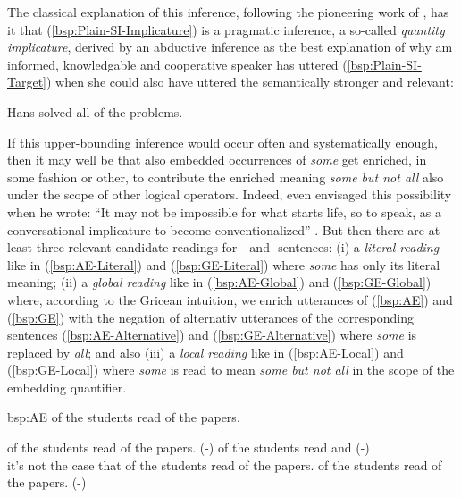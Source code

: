 \documentclass[fleqn,reqno,10pt,draft]{article}
\newcommand{\lit}{\acro{lit}}
\newcommand{\glb}{\acro{glb}}
\newcommand{\loc}{\acro{loc}}
\newcommand{\as}{\acro{as}}
\renewcommand{\es}{\acro{es}}
\newcommand{\mymark}[1]{{\color{mycol}{#1}}}
\begin{document}
\noindent The classical explanation of this inference, following the
pioneering work of \citet{Grice1975:Logic-and-Conve}, has it that
(\ref{bsp:Plain-SI-Implicature}) is a pragmatic inference, a so-called
\emph{quantity implicature}, derived by an abductive inference as the
best explanation of why am informed, knowledgable and cooperative
speaker has uttered (\ref{bsp:Plain-SI-Target}) when she could also
have uttered the semantically stronger and relevant:

\begin{exe}
    \begin{xlist}
       \label{bsp:Plain-SI-Alternative} Hans solved all of the problems.
    \end{xlist}
\end{exe}

\noindent If this upper-bounding inference would occur often and
systematically enough, then it may well be that also embedded
occurrences of \emph{some} get enriched, in some fashion or other, to
contribute the enriched meaning \emph{some but not all} also under the
scope of other logical operators. Indeed, even
\citeauthor{Grice1975:Logic-and-Conve} envisaged this possibility when
he wrote: ``It may not be impossible for what starts life, so to
speak, as a conversational implicature to become conventionalized''
\citep[p.58]{Grice1975:Logic-and-Conve}. But then there are at least
three relevant candidate readings for \as- and \es-sentences: (i) a
\emph{literal reading} like in (\ref{bsp:AE-Literal}) and
(\ref{bsp:GE-Literal}) where \emph{some} has only its literal meaning;
(ii) a \emph{global reading} like in (\ref{bsp:AE-Global}) and
(\ref{bsp:GE-Global}) where, according to the Gricean intuition, we
enrich utterances of (\ref{bsp:AE}) and (\ref{bsp:GE}) with the
negation of alternativ utterances of the corresponding sentences
(\ref{bsp:AE-Alternative}) and (\ref{bsp:GE-Alternative}) where
\emph{some} is replaced by \emph{all}; and also (iii) a \emph{local
  reading} like in (\ref{bsp:AE-Local}) and (\ref{bsp:GE-Local}) where
\emph{some} is read to mean \emph{some but not all} in the scope of
the embedding quantifier.


\begin{exer}{bsp:AE}
  \ex \mymark{All} of the students read {\mymark{some}} of the
  papers. 

  \begin{xlist}
  \ex \label{bsp:AE-Literal} \mymark{All} of the students read
    {\mymark{some and maybe all}} of the papers. \hfill (\as-\lit)
  \ex \label{bsp:AE-Global}
    \mymark{All} of the students read \mymark{some} 
    and  \hfill (\as-\glb)\\
    it's not the case that \mymark{all} of the students read \mymark{all} of the papers.
  \ex \label{bsp:AE-Local}
    \mymark{All} of the students read {\mymark{some  but not all}} of the
    papers. \hfill (\as-\loc)
  \end{xlist}
\end{exer}
\end{document}
